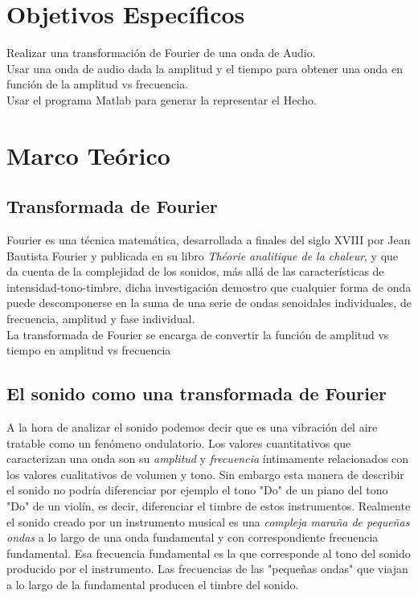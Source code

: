 \documentclass[10pt,a4paper]{book}
\begin{document}
\section{Objetivos Específicos}

Realizar una transformación de Fourier de una onda de Audio.\\
Usar una onda de audio dada la amplitud y el tiempo para obtener una onda en función de la amplitud vs frecuencia.\\
Usar el programa Matlab para generar la representar el Hecho.\\

\section{Marco Teórico}

\subsection{Transformada de Fourier}

Fourier  es una técnica matemática, desarrollada a finales del siglo XVIII por Jean Bautista Fourier y publicada en su libro \textit{Théorie analitique de la chaleur}, y que da cuenta de la complejidad de los sonidos, más allá de las características de intensidad-tono-timbre, dicha investigación demostro que cualquier forma de onda puede descomponerse en la suma de una serie de ondas senoidales individuales, de frecuencia, amplitud y fase individual. \\
La transformada de Fourier se encarga de convertir la función de amplitud vs tiempo en amplitud vs frecuencia

\subsection{El sonido como una transformada de Fourier}

A la hora de analizar el sonido podemos decir que es una vibración del aire tratable como un fenómeno ondulatorio. Los valores cuantitativos que caracterizan una onda son su \textit{amplitud} y \textit{frecuencia} íntimamente relacionados con los valores cualitativos de volumen y tono. Sin embargo esta manera de describir el sonido no podría diferenciar por ejemplo el tono "Do" de un piano del tono "Do" de un violín, es decir, diferenciar el timbre de estos instrumentos. Realmente el sonido creado por un instrumento musical es una \textit{compleja maraña de pequeñas ondas} a lo largo de una onda fundamental y con correspondiente frecuencia fundamental. Esa frecuencia fundamental es la que corresponde al tono del sonido producido por el instrumento. Las frecuencias de las "pequeñas ondas" que viajan a lo largo de la fundamental producen el timbre del sonido.\\
\end{document}
